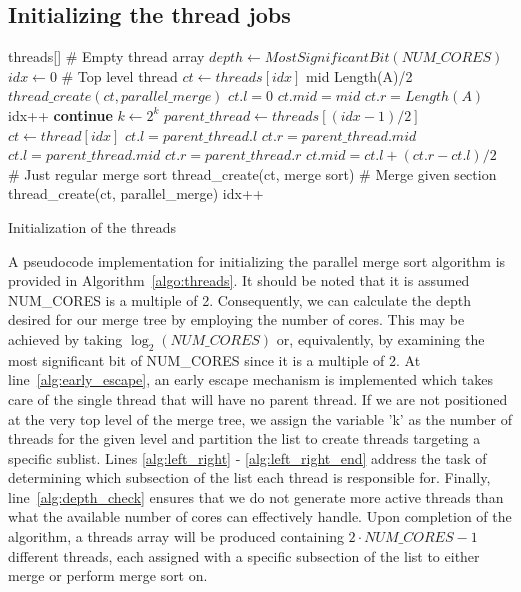 \subsection{Initializing the thread jobs}\label{sec:init_threads}
\begin{algorithm}
  \begin{algorithmic}[1]
    \Require threads[] \# Empty thread array
    \State $depth \leftarrow MostSignificantBit(NUM\_CORES)$
    \State $idx \leftarrow 0$
     \label{alg:early_escape}
    \State \# Top level thread
    \State $ct \leftarrow threads[idx]$
    \State mid \leftarrow Length(A)/2
    \State $thread\_create(ct, parallel\_merge)$
    \State $ct.l = 0$
    \State $ct.mid = mid$
    \State $ct.r = Length(A)$
    \State idx++
    \State \textbf{continue}
    \EndIf
    \State $k \leftarrow 2^k$
    \State $parent\_thread \leftarrow threads[(idx - 1)/2]$
    \State $ct \leftarrow thread[idx]$
     \label{alg:left_right}
    \State $ct.l = parent\_thread.l$
    \State $ct.r = parent\_thread.mid$
    \Else
    \State $ct.l = parent\_thread.mid$
    \State $ct.r = parent\_thread.r$
    \EndIf
    \State $ct.mid = ct.l + (ct.r - ct.l)/2$ \label{alg:left_right_end}
     \label{alg:depth_check}
    \State \# Just regular merge sort
    \State thread\_create(ct, merge sort)
    \Else
    \State \# Merge given section
    \State thread\_create(ct, parallel\_merge)
    \EndIf
    \State idx++
    \EndFor
    \EndFor
  \EndProcedure
  \end{algorithmic}
  \caption{Initialization of the threads}\label{algo:threads}
\end{algorithm}
A pseudocode implementation for initializing the parallel merge sort algorithm
is provided in Algorithm~\ref{algo:threads}. It should be noted that it is
assumed NUM\_CORES is a multiple of 2. Consequently, we can calculate the depth
desired for our merge tree by employing the number of cores. This may be
achieved by taking $\log_2(NUM\_CORES)$ or, equivalently, by examining the most
significant bit of NUM\_CORES since it is a multiple of 2. At
line~\ref{alg:early_escape}, an early escape mechanism is implemented which
takes care of the single thread that will have no parent thread. If we are not
positioned at the very top level of the merge tree, we assign the variable 'k'
as the number of threads for the given level and partition the list to create
threads targeting a specific sublist. Lines \ref{alg:left_right} -
\ref{alg:left_right_end} address the task of determining which subsection of the
list each thread is responsible for. Finally, line~\ref{alg:depth_check} ensures
that we do not generate more active threads than what the available number of
cores can effectively handle. Upon completion of the algorithm, a threads array
will be produced containing $2 \cdot NUM\_CORES - 1$ different threads, each
assigned with a specific subsection of the list to either merge or perform
merge sort on.

